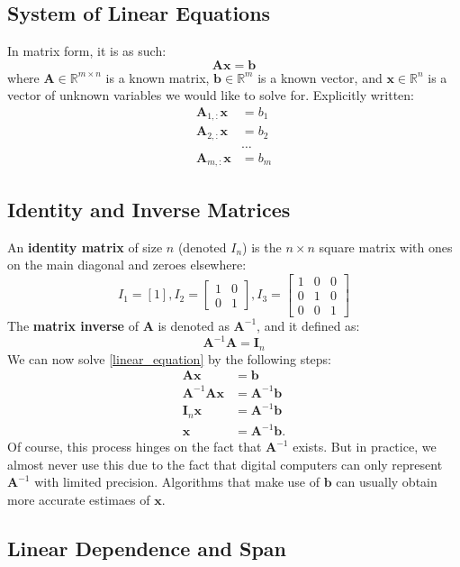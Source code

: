 \documentclass[11pt,twocolumn]{report}
\def\realnumbers{\mathbb{R}}
\begin{document}
\subsection{System of Linear Equations}
In matrix form, it is as such:
\begin{equation}
	\label{linear_equation}
	\bm{Ax} = \bm{b}
\end{equation}
where $\bm{A} \in \realnumbers^{m \times n}$ is a known matrix, $\bm{b} \in
\realnumbers^m$ is a known vector, and $\bm{x} \in \realnumbers^n$ is a vector
of unknown variables we would like to solve for. Explicitly written:
\begin{align}
	\bm{A}_{1, :}\bm{x} & = b_1\\
	\bm{A}_{2, :}\bm{x} & = b_2\\
	& \hdots\\
	\bm{A}_{m, :}\bm{x} & = b_m
\end{align}

\subsection{Identity and Inverse Matrices}
An \textbf{identity matrix} of size $n$ (denoted $I_n$)
is the $n \times n$ square matrix with ones on the main diagonal and
zeroes elsewhere:
\begin{equation*}
	I_1 = [1],
	I_2 = \begin{bmatrix}
		1 & 0\\
		0 & 1
	\end{bmatrix},
	I_3 = \begin{bmatrix}
		1 & 0 & 0\\
		0 & 1 & 0\\
		0 & 0 & 1
	\end{bmatrix}
\end{equation*}
The \textbf{matrix inverse} of $\bm{A}$ is denoted as $\bm{A}^{-1}$, and it defined as:
\begin{equation}
	\bm{A}^{-1}\bm{A} = \bm{I}_n
\end{equation}
We can now solve \ref{linear_equation} by the following steps:
\begin{align}
	\bm{Ax} & = \bm{b}\\
	\bm{A}^{-1}\bm{Ax} & = \bm{A}^{-1}\bm{b}\\
	\bm{I}_n\bm{x} & = \bm{A}^{-1}\bm{b}\\
	\bm{x} & = \bm{A}^{-1}\bm{b}.
\end{align}
Of course, this process hinges on the fact that $\bm{A}^{-1}$ exists.
But in practice, we almost never use this due to the fact that digital
computers can only represent $\bm{A}^{-1}$ with limited precision. Algorithms
that make use of $\bm{b}$ can usually obtain more accurate estimaes of
$\bm{x}$.

\subsection{Linear Dependence and Span}
\end{document}
